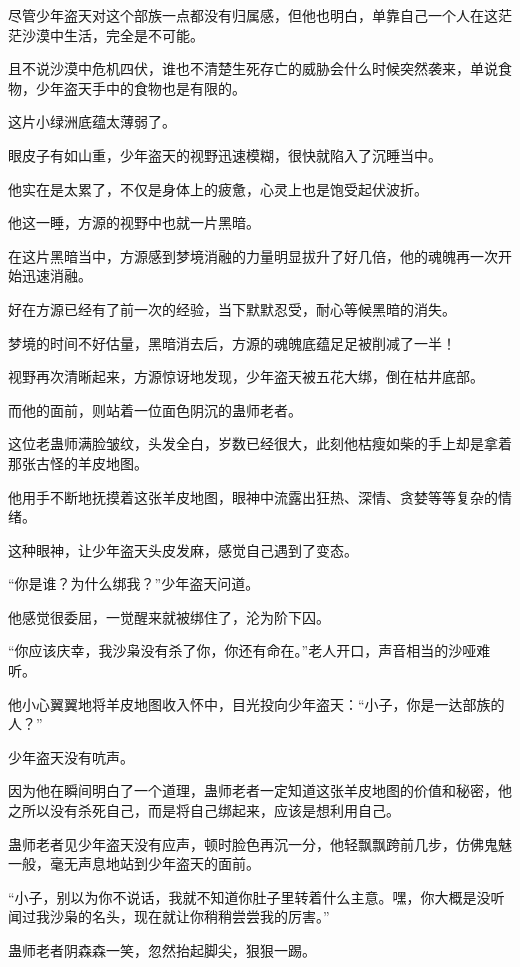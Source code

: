 \begin{this_body}
尽管少年盗天对这个部族一点都没有归属感，但他也明白，单靠自己一个人在这茫茫沙漠中生活，完全是不可能。

且不说沙漠中危机四伏，谁也不清楚生死存亡的威胁会什么时候突然袭来，单说食物，少年盗天手中的食物也是有限的。

这片小绿洲底蕴太薄弱了。

眼皮子有如山重，少年盗天的视野迅速模糊，很快就陷入了沉睡当中。

他实在是太累了，不仅是身体上的疲惫，心灵上也是饱受起伏波折。

他这一睡，方源的视野中也就一片黑暗。

在这片黑暗当中，方源感到梦境消融的力量明显拔升了好几倍，他的魂魄再一次开始迅速消融。

好在方源已经有了前一次的经验，当下默默忍受，耐心等候黑暗的消失。

梦境的时间不好估量，黑暗消去后，方源的魂魄底蕴足足被削减了一半！

视野再次清晰起来，方源惊讶地发现，少年盗天被五花大绑，倒在枯井底部。

而他的面前，则站着一位面色阴沉的蛊师老者。

这位老蛊师满脸皱纹，头发全白，岁数已经很大，此刻他枯瘦如柴的手上却是拿着那张古怪的羊皮地图。

他用手不断地抚摸着这张羊皮地图，眼神中流露出狂热、深情、贪婪等等复杂的情绪。

这种眼神，让少年盗天头皮发麻，感觉自己遇到了变态。

“你是谁？为什么绑我？”少年盗天问道。

他感觉很委屈，一觉醒来就被绑住了，沦为阶下囚。

“你应该庆幸，我沙枭没有杀了你，你还有命在。”老人开口，声音相当的沙哑难听。

他小心翼翼地将羊皮地图收入怀中，目光投向少年盗天：“小子，你是一达部族的人？”

少年盗天没有吭声。

因为他在瞬间明白了一个道理，蛊师老者一定知道这张羊皮地图的价值和秘密，他之所以没有杀死自己，而是将自己绑起来，应该是想利用自己。

蛊师老者见少年盗天没有应声，顿时脸色再沉一分，他轻飘飘跨前几步，仿佛鬼魅一般，毫无声息地站到少年盗天的面前。

“小子，别以为你不说话，我就不知道你肚子里转着什么主意。嘿，你大概是没听闻过我沙枭的名头，现在就让你稍稍尝尝我的厉害。”

蛊师老者阴森森一笑，忽然抬起脚尖，狠狠一踢。


\end{this_body}
